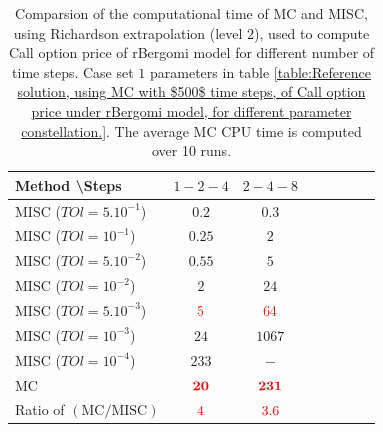 \documentclass[11pt]{article}
\begin{document}
\begin{table}[!h]
\centering
\begin{tabular}{l*{6}{c}r}
Method \textbackslash  Steps            & $1-2-4$ & $2-4-8$   \\
\hline
MISC ($TOl=5.10^{-1}$)  & $0.2$ & $0.3$  \\
MISC ($TOl=10^{-1}$)  & $0.25$ & $2$ &   \\
MISC ($TOl=5.10^{-2}$)  & $0.55$ & $5$  \\
MISC ($TOl=10^{-2}$)  & $2$ & $24$   \\
MISC ($TOl=5.10^{-3}$)  & ${\color{red}5}$ & ${\color{red}64}$  \\	
MISC ($TOl=10^{-3}$)  & $24$ & $1067$  \\	
MISC ($TOl=10^{-4}$)  & $ 233$ & $-$   \\
\hline
MC    & $\mathbf{ {\color{red}20}}$  & $\mathbf{ {\color{red}231}}$  \\

\hline
Ratio of $\left(\text{MC}/ \text{MISC} \right)$  &${\color{red}4}$ & ${\color{red}  3.6}$   \\
\hline
\end{tabular}
\caption{Comparsion of the computational time of  MC and MISC, using Richardson extrapolation (level $2$), used to compute Call option price of rBergomi model for different number of time steps. Case set $1$ parameters in table \ref{table:Reference solution, using MC with $500$ time steps, of Call option price under rBergomi model, for different parameter constellation.}. The
	average MC CPU time is computed over 10 runs.}
\label{Comparsion of the computational time of  MC and MISC, using Richardson extrapolation (level $2$), used to compute Call option price of rBergomi model for different number of time steps. Case set $1$ parameters}
\end{table}


\FloatBarrier
\end{document}
